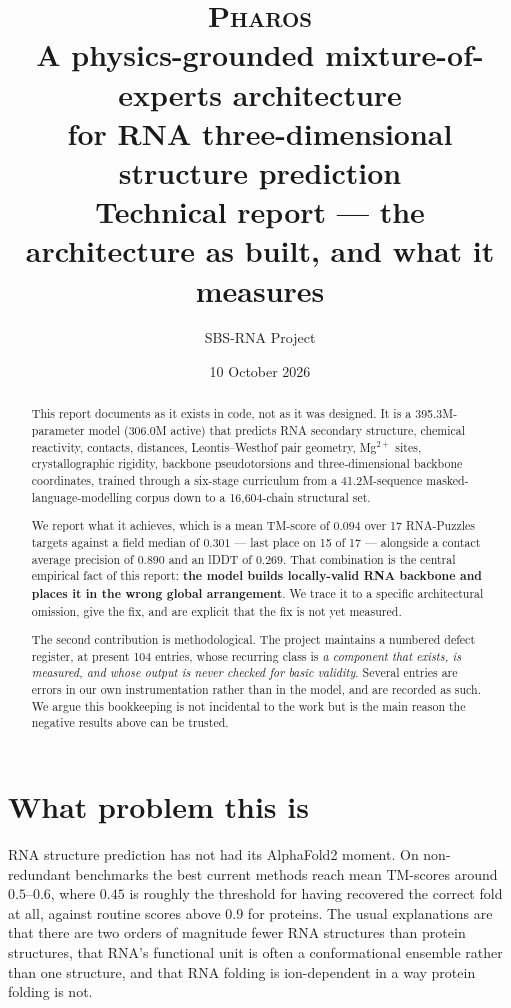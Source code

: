 \documentclass[11pt,a4paper]{article}
\title{\textbf{\textsc{Pharos}}\\[0.35em]
\large A physics-grounded mixture-of-experts architecture\\
for RNA three-dimensional structure prediction\\[0.7em]
\normalsize Technical report --- the architecture as built, and what it measures}
\author{SBS-RNA Project}
\date{10 October 2026}
\begin{document}
\maketitle

\begin{abstract}
\noindent
This report documents \pharos{} as it exists in code, not as it was
designed. It is a 395.3M-parameter model (306.0M active) that predicts RNA
secondary structure, chemical reactivity, contacts, distances,
Leontis--Westhof pair geometry, Mg$^{2+}$ sites, crystallographic
rigidity, backbone pseudotorsions and three-dimensional backbone
coordinates, trained through a six-stage curriculum from a 41.2M-sequence
masked-language-modelling corpus down to a 16{,}604-chain
structural set.

We report what it achieves, which is a mean TM-score of
$\mathbf{0.094}$ over 17 RNA-Puzzles targets against a field median of
$0.301$ --- last place on 15 of 17 --- alongside a contact average
precision of $0.890$ and an lDDT of $0.269$. That combination is the
central empirical fact of this report: \textbf{the model builds
locally-valid RNA backbone and places it in the wrong global
arrangement}. We trace it to a specific architectural omission, give the
fix, and are explicit that the fix is not yet measured.

The second contribution is methodological. The project maintains a
numbered defect register, at present 104 entries, whose recurring class
is \emph{a component that exists, is measured, and whose output is never
checked for basic validity}. Several entries are errors in our own
instrumentation rather than in the model, and are recorded as such.
We argue this bookkeeping is not incidental to the work but is the main
reason the negative results above can be trusted.
\end{abstract}

\tableofcontents
\bigskip

\section{What problem this is}

RNA structure prediction has not had its AlphaFold2 moment. On
non-redundant benchmarks the best current methods reach mean TM-scores
around $0.5$--$0.6$, where $0.45$ is roughly the threshold for having
recovered the correct fold at all, against routine scores above $0.9$ for
proteins. The usual explanations are that there are two orders of
magnitude fewer RNA structures than protein structures, that RNA's
functional unit is often a conformational ensemble rather than one
structure, and that RNA folding is ion-dependent in a way protein folding
is not.
\end{document}
